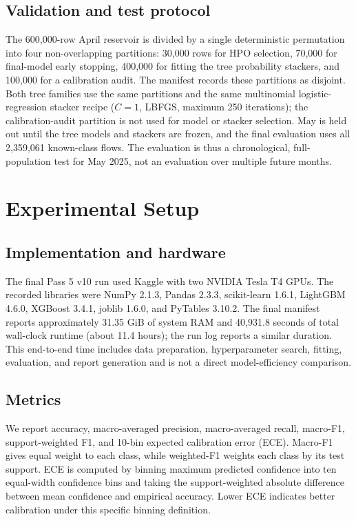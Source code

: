 \documentclass[conference]{IEEEtran}
\begin{document}
\subsection{Validation and test protocol}

The 600,000-row April reservoir is divided by a single deterministic permutation into four non-overlapping partitions: 30,000 rows for HPO selection, 70,000 for final-model early stopping, 400,000 for fitting the tree probability stackers, and 100,000 for a calibration audit. The manifest records these partitions as disjoint. Both tree families use the same partitions and the same multinomial logistic-regression stacker recipe ($C=1$, LBFGS, maximum 250 iterations); the calibration-audit partition is not used for model or stacker selection. May is held out until the tree models and stackers are frozen, and the final evaluation uses all 2,359,061 known-class flows. The evaluation is thus a chronological, full-population test for May 2025, not an evaluation over multiple future months.

\section{Experimental Setup}
\label{sec:setup}

\subsection{Implementation and hardware}

The final Pass 5 v10 run used Kaggle with two NVIDIA Tesla T4 GPUs. The recorded libraries were NumPy 2.1.3, Pandas 2.3.3, scikit-learn 1.6.1, LightGBM 4.6.0, XGBoost 3.4.1, joblib 1.6.0, and PyTables 3.10.2. The final manifest reports approximately 31.35 GiB of system RAM and 40,931.8 seconds of total wall-clock runtime (about 11.4 hours); the run log reports a similar duration. This end-to-end time includes data preparation, hyperparameter search, fitting, evaluation, and report generation and is not a direct model-efficiency comparison.

\subsection{Metrics}

We report accuracy, macro-averaged precision, macro-averaged recall, macro-F1, support-weighted F1, and 10-bin expected calibration error (ECE). Macro-F1 gives equal weight to each class, while weighted-F1 weights each class by its test support. ECE is computed by binning maximum predicted confidence into ten equal-width confidence bins and taking the support-weighted absolute difference between mean confidence and empirical accuracy. Lower ECE indicates better calibration under this specific binning definition.
\end{document}
